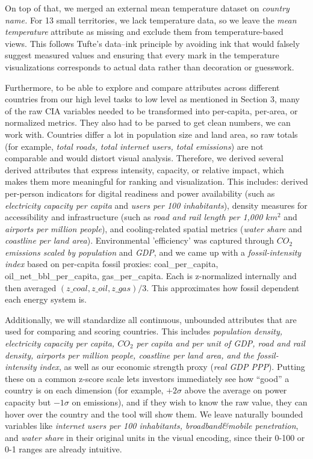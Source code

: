 \documentclass{vgtc}                          %
\begin{document}
\noindent On top of that, we merged an external mean temperature dataset on \textit{country name.} For 13 small territories, we lack temperature data, so we leave the \textit{mean temperature} attribute as missing and exclude them from temperature-based views. This follows Tufte’s data–ink principle by avoiding ink that would falsely suggest measured values and ensuring that every mark in the temperature visualizations corresponds to actual data rather than decoration or guesswork.
\smallskip

\noindent Furthermore, to be able to explore and compare attributes across different countries from our high level tasks to low level as mentioned in Section 3, many of the raw CIA variables needed to be transformed into per-capita, per-area, or normalized metrics. They also had to be parsed to get clean numbers, we can work with. Countries differ a lot in population size and land area, so raw totals (for example, \textit{total roads, total internet users, total emissions}) are not comparable and would distort visual analysis. Therefore, we derived several derived attributes that express intensity, capacity, or relative impact, which makes them more meaningful for ranking and visualization. This includes: derived per-person indicators for digital readiness and power availability (such as \textit{electricity capacity per capita} and \textit{users per 100 inhabitants}), density measures for accessibility and infrastructure (such as \textit{road and rail length per 1,000 $km^2$} and \textit{airports per million people}), and cooling-related spatial metrics (\textit{water share} and \textit{coastline per land area}). Environmental 'efficiency' was captured through \textit{$CO_2$ emissions scaled by population} and \textit{GDP}, and we came up with a \textit{fossil-intensity index} based on per-capita fossil proxies: coal\_per\_capita, oil\_net\_bbl\_per\_capita, gas\_per\_capita. Each is z-normalized internally and then averaged $(z\_coal, z\_oil, z\_gas) / 3$. This approximates how fossil dependent each energy system is. 
\smallskip

\noindent Additionally, we will standardize all continuous, unbounded attributes that are used for comparing and scoring countries. This includes \textit{population density, electricity capacity per capita, $CO_2$ per capita and per unit of GDP, road and rail density, airports per million people, coastline per land area, and the fossil-intensity index}, as well as our economic strength proxy (\textit{real GDP PPP}). Putting these on a common z-score scale lets investors immediately see how “good” a country is on each dimension (for example, $+2\sigma$ above the average on power capacity but $-1\sigma$ on emissions), and if they wish to know the raw value, they can hover over the country and the tool will show them. We leave naturally bounded variables like \textit{internet users per 100 inhabitants, broadband\&mobile penetration}, and \textit{water share} in their original units in the visual encoding, since their 0-100 or 0-1 ranges are already intuitive.
\smallskip
\end{document}
